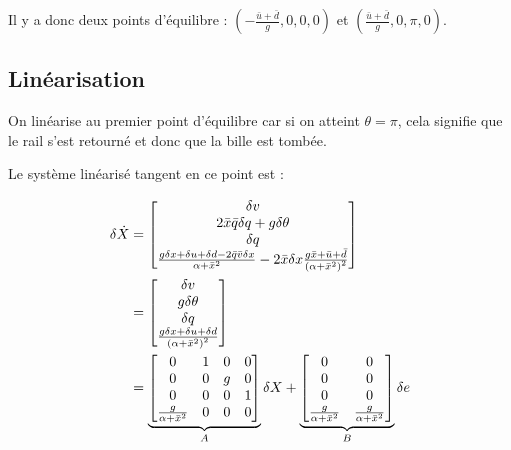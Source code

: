 \documentclass[10pt]{article}
\begin{document}
\vspace{10px}

\noindent Il y a donc deux points d'équilibre : $\left( - \frac{\bar u + \bar d}{g}, 0, 0, 0 \right)$ et $\left( \frac{\bar u + \bar d}{g}, 0, \pi, 0 \right)$.

\subsection*{Linéarisation}

On linéarise au premier point d'équilibre car si on atteint $\theta = \pi$, cela signifie que le rail s'est retourné et donc que la bille est tombée.

\vspace{10px}

\noindent Le système linéarisé tangent en ce point est :

\begin{align}
\delta \dot X &=
	\begin{bmatrix} 
		\delta v \\
		2 \bar x \bar q \delta q + g \delta \theta \\
		\delta q \\
		\frac{g \delta x + \delta u + \delta d - 2 \bar q \bar v \delta x}{\alpha + \bar x^2} - 2 \bar x \delta x \frac{g \bar x + \bar u + \bar d}{\left( \alpha + \bar x^2 \right)^2}
	\end{bmatrix} \notag \\
	&= \begin{bmatrix} 
		\delta v \\
		g \delta \theta \\
		\delta q \\
		\frac{g \delta x + \delta u + \delta d}{\left( \alpha + \bar x^2 \right)^2}
	\end{bmatrix} \notag \\
	&= \underbrace{
	\begin{bmatrix}
		0 & 1 & 0 & 0 \\
		0 & 0 & g & 0 \\
		0 & 0 & 0 & 1 \\
		\frac{g}{\alpha + \bar x^2} & 0 & 0 & 0
	\end{bmatrix}
	}_{A}
	\delta X
	+
	\underbrace{
	\begin{bmatrix}
		0 & 0 \\
		0 & 0 \\
		0 & 0 \\
		\frac{g}{\alpha + \bar x^2} & \frac{g}{\alpha + \bar x^2}
	\end{bmatrix}
	}_{B}
	\delta e \notag
\end{align}
\end{document}
